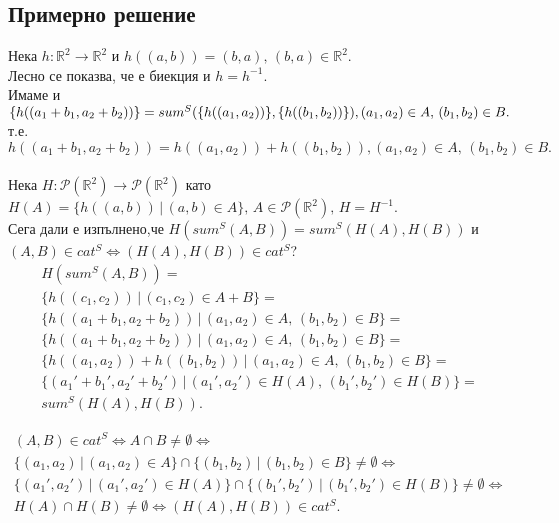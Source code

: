 \documentclass[12pt]{article}
\begin{document}
\newpage
\subsection{Примерно решение}
\begin{addmargin}[1em]{2em}

Нека $h:\mathbb{R}^2 \rightarrow \mathbb{R}^2$ и 
$h((a,b)) = (b,a),\, (b,a) \in \mathbb{R}^2$.\\
Лесно се показва, че е биекция и $h=h^{-1}$.\\
Имаме и $\{h((a_{1} + b_{1},a_{2} + b_{2}))\} = sum^S(\{h((a_{1}, a_{2}))\},\{h((b_{1}, b_{2}))\}),\\ (a_{1}, a_{2})\in A,\,(b_{1}, b_{2})\in B.$ т.е. \\$h((a_{1} + b_{1},a_{2} + b_{2})) = h((a_{1}, a_{2})) + h((b_{1}, b_{2})), (a_{1}, a_{2})\in A,\,(b_{1}, b_{2})\in B.$\\\\
Нека $H:\mathcal{P}(\mathbb{R}^2)\rightarrow \mathcal{P}(\mathbb{R}^2)$ като $H(A) = \{h((a,b))\,|\,(a,b) \in A\},\,A \in \mathcal{P}(\mathbb{R}^2),\, H = H^{-1}$.\\
Сега дали е изпълнено,че $H(sum^S(A,B)) = sum^S(H(A),H(B))$ и $(A,B) \in cat^S \iff (H(A), H(B)) \in cat^S$?\\
\begin{eqnarray*}
    H(sum^S(A,B)) =\\
    \{h((c_{1},c_{2}))\,|\,(c_{1},c_{2})\in A+B\}=\\
    \{h((a_{1} + b_{1},a_{2} + b_{2}))\,|\,(a_{1}, a_{2})\in A,\,(b_{1}, b_{2})\in B\}=\\
    \{h((a_{1} + b_{1},a_{2} + b_{2}))\,|\,(a_{1}, a_{2})\in A,\,(b_{1}, b_{2})\in B\}=\\
    \{h((a_{1}, a_{2})) + h((b_{1}, b_{2}))\,|\,(a_{1}, a_{2})\in A,\,(b_{1}, b_{2})\in B\}=\\
    \{(a_{1}' + b_{1}',a_{2}' + b_{2}')\,|\,(a_{1}', a_{2}')\in H(A),\,(b_{1}', b_{2}')\in H(B)\}=\\
    sum^S(H(A),H(B)).
\end{eqnarray*}

\begin{eqnarray*}
    (A,B) \in cat^S \iff A \cap B \neq \emptyset \iff \\
    \{(a_{1},a_{2})\,|\,(a_{1},a_{2}) \in A\} \cap \{(b_{1},b_{2})\,|\,(b_{1},b_{2}) \in B\} \neq \emptyset \iff \\
    \{(a_{1}',a_{2}')\,|\,(a_{1}',a_{2}') \in H(A)\} \cap \{(b_{1}',b_{2}')\,|\,(b_{1}',b_{2}') \in H(B)\} \neq \emptyset \iff \\
    H(A) \cap H(B) \neq \emptyset \iff (H(A),H(B)) \in cat^S.
\end{eqnarray*}

\end{addmargin}
\end{document}
